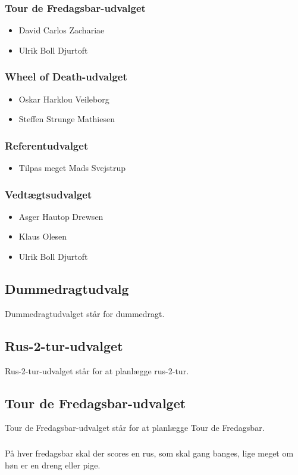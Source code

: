 \documentclass{article}
\begin{document}
	\subsubsection{Tour de Fredagsbar-udvalget}
	\begin{itemize}
		\item David Carlos Zachariae
		\item Ulrik Boll Djurtoft
	\end{itemize}
	\subsubsection{Wheel of Death-udvalget}
	\begin{itemize}
		\item Oskar Harklou Veileborg
		\item Steffen Strunge Mathiesen
	\end{itemize}
	\subsubsection{Referentudvalget}
	\begin{itemize}
		\item Tilpas meget Mads Svejstrup
	\end{itemize}
	\subsubsection{Vedtægtsudvalget}
	\begin{itemize}
		\item Asger Hautop Drewsen
		\item Klaus Olesen
		\item Ulrik Boll Djurtoft
	\end{itemize}

	\subsection{Dummedragtudvalg}
	Dummedragtudvalget står for dummedragt.
	\subsection{Rus-2-tur-udvalget}
	Rus-2-tur-udvalget står for at planlægge rus-2-tur.
	\subsection{Tour de Fredagsbar-udvalget}
	Tour de Fredagsbar-udvalget står for at planlægge Tour de Fredagsbar.
	\subsubsection{}
	På hver fredagsbar skal der scores en rus, som skal gang banges, lige meget om høn er en dreng eller pige.
\end{document}
